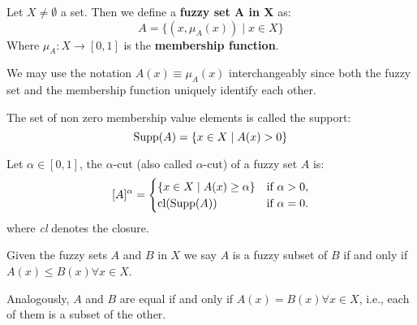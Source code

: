 
\begin{definition}
    Let $X\neq\emptyset$ a set. Then we define a \textbf{fuzzy set A in X} as:
    \[A=\{(x,\mu_A(x))\mid x\in X\}\]
    Where $\mu_A:X\longrightarrow [0,1]$ is the \textbf{membership function}.
\end{definition}

\begin{remark}
    We may use the notation \( A(x) \equiv \mu_A(x) \) interchangeably since both the fuzzy set and the membership function uniquely identify each other.
\end{remark}

\begin{definition}[Support]
    The set of non zero membership value elements is called the support:
    \[\textnormal{Supp}(A)=\{x\in X \mid A(x)>0\}\]
\end{definition}

\begin{definition}
    Let $\alpha \in [0,1]$, the $\alpha$-cut (also called $\alpha$-cut) of a fuzzy set \( A \) is:
    \[
    [A]^\alpha =
    \begin{cases}
    \{x \in X \mid A(x)\geq \alpha\} & \text{if } \alpha > 0, \\
    \textnormal{cl}(\textnormal{Supp}(A)) & \text{if } \alpha = 0.
    \end{cases}
    \]
    where \textit{cl} denotes the closure.
\end{definition}



\begin{definition}
    Given the fuzzy sets $A$ and $B$ in $X$ we say $A$ is a fuzzy subset of $B$ if and only if $A(x)
    \leq B(x) \forall x \in X$.

    Analogously, $A$ and $B$ are equal if and only if $A(x)=B(x) \forall x \in X$, i.e., each of them is a subset of the other.
\end{definition}

